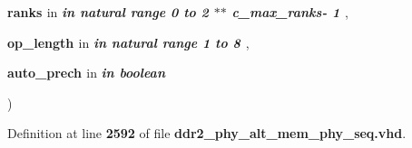 {\begin{DoxyParamCaption}
\item[{}]{{\bfseries \textcolor{vhdlchar}{ranks}\textcolor{vhdlchar}{ }}\textcolor{stringliteral}{in} {\em {\bfseries \textcolor{keywordflow}{in}\textcolor{vhdlchar}{ }\textcolor{comment}{natural}\textcolor{vhdlchar}{ }\textcolor{vhdlchar}{ }\textcolor{vhdlchar}{ }\textcolor{keywordflow}{range}\textcolor{vhdlchar}{ }\textcolor{vhdlchar}{ } \textcolor{vhdldigit}{0} \textcolor{vhdlchar}{ }\textcolor{keywordflow}{to}\textcolor{vhdlchar}{ }\textcolor{vhdlchar}{ } \textcolor{vhdldigit}{2} \textcolor{vhdlchar}{$\ast$}\textcolor{vhdlchar}{$\ast$}\textcolor{vhdlchar}{ }\textcolor{vhdlchar}{ }\textcolor{vhdlchar}{ }\textcolor{vhdlchar}{c\+\_\+max\+\_\+ranks}\textcolor{vhdlchar}{-\/}\textcolor{vhdlchar}{ } \textcolor{vhdldigit}{1} \textcolor{vhdlchar}{ }}} , }
\item[{}]{{\bfseries \textcolor{vhdlchar}{op\+\_\+length}\textcolor{vhdlchar}{ }}\textcolor{stringliteral}{in} {\em {\bfseries \textcolor{keywordflow}{in}\textcolor{vhdlchar}{ }\textcolor{comment}{natural}\textcolor{vhdlchar}{ }\textcolor{vhdlchar}{ }\textcolor{vhdlchar}{ }\textcolor{keywordflow}{range}\textcolor{vhdlchar}{ }\textcolor{vhdlchar}{ } \textcolor{vhdldigit}{1} \textcolor{vhdlchar}{ }\textcolor{keywordflow}{to}\textcolor{vhdlchar}{ }\textcolor{vhdlchar}{ } \textcolor{vhdldigit}{8} \textcolor{vhdlchar}{ }}} , }
\item[{}]{{\bfseries \textcolor{vhdlchar}{auto\+\_\+prech}\textcolor{vhdlchar}{ }}\textcolor{stringliteral}{in} {\em {\bfseries \textcolor{keywordflow}{in}\textcolor{vhdlchar}{ }\textcolor{comment}{boolean}\textcolor{vhdlchar}{ }\textcolor{vhdlchar}{ }\textcolor{vhdlchar}{ }}}}
\end{DoxyParamCaption}
)\hspace{0.3cm}{\ttfamily [Function]}}\label{class__ddr2__phy__alt__mem__phy__addr__cmd__pkg_a54ccdb29a605bdd215d0f966bca08f64}


Definition at line {\bf 2592} of file {\bf ddr2\+\_\+phy\+\_\+alt\+\_\+mem\+\_\+phy\+\_\+seq.\+vhd}.


